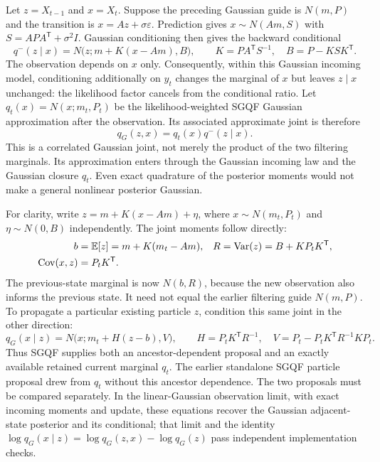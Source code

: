 \documentclass[11pt]{article}
\begin{document}
Let $z=X_{t-1}$ and $x=X_t$. Suppose the preceding Gaussian guide is
$N(m,P)$ and the transition is $x=Az+\sigma\varepsilon$. Prediction gives
$x\sim N(Am,S)$ with $S=APA^{\mathsf T}+\sigma^2I$. Gaussian conditioning
then gives the backward conditional
\begin{equation}
 q^-(z\mid x)=N\bigl(z;m+K(x-Am),B\bigr),\qquad
 K=PA^{\mathsf T}S^{-1},\quad B=P-KSK^{\mathsf T}.
 \label{eq:sgqf-preserve-backward}
\end{equation}
The observation depends on $x$ only. Consequently, within this Gaussian
incoming model, conditioning additionally on $y_t$ changes the marginal of
$x$ but leaves $z\mid x$ unchanged: the likelihood factor cancels from the
conditional ratio. Let $q_t(x)=N(x;m_t,P_t)$ be the likelihood-weighted SGQF
Gaussian approximation after the observation. Its associated approximate
joint is therefore
\begin{equation}
 q_G(z,x)=q_t(x)q^-(z\mid x).
 \label{eq:sgqf-preserve-joint}
\end{equation}
This is a correlated Gaussian joint, not merely the product of the two
filtering marginals. Its approximation enters through the Gaussian incoming
law and the Gaussian closure $q_t$. Even exact quadrature of the posterior
moments would not make a general nonlinear posterior Gaussian.

For clarity, write $z=m+K(x-Am)+\eta$, where $x\sim N(m_t,P_t)$ and
$\eta\sim N(0,B)$ independently. The joint moments follow directly:
\begin{align}
 b&=\mathbb E[z]=m+K(m_t-Am),&
 R&=\operatorname{Var}(z)=B+KP_tK^{\mathsf T},\notag\\
 \operatorname{Cov}(x,z)&=P_tK^{\mathsf T}.&&
 \label{eq:sgqf-preserve-joint-moments}
\end{align}
The previous-state marginal is now $N(b,R)$, because the new observation
also informs the previous state. It need not equal the earlier filtering
guide $N(m,P)$. To propagate a particular existing particle $z$, condition
this same joint in the other direction:
\begin{equation}
 q_G(x\mid z)=N\bigl(x;m_t+H(z-b),V\bigr),\qquad
 H=P_tK^{\mathsf T}R^{-1},\quad
 V=P_t-P_tK^{\mathsf T}R^{-1}KP_t.
 \label{eq:sgqf-preserve-forward}
\end{equation}
Thus SGQF supplies both an ancestor-dependent proposal and an exactly
available retained current marginal $q_t$. The earlier standalone SGQF
particle proposal drew from $q_t$ without this ancestor dependence. The two
proposals must be compared separately. In the linear-Gaussian observation
limit, with exact incoming moments and update, these equations recover the
Gaussian adjacent-state posterior and its conditional; that limit and the
identity $\log q_G(x\mid z)=\log q_G(z,x)-\log q_G(z)$ pass independent
implementation checks.
\end{document}
